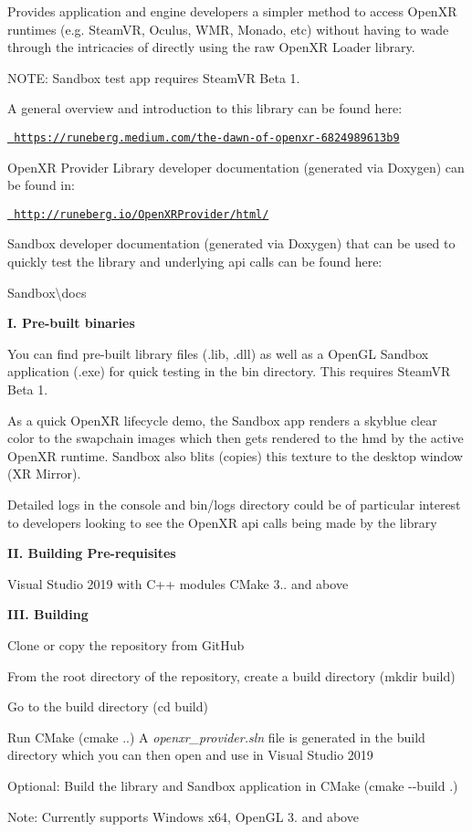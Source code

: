 Provides application and engine developers a simpler method to access Open\+XR runtimes (e.\+g. Steam\+VR, Oculus, W\+MR, Monado, etc) without having to wade through the intricacies of directly using the raw Open\+XR Loader library.

N\+O\+TE\+: Sandbox test app requires Steam\+VR Beta 1.

A general overview and introduction to this library can be found here\+:

\href{https://runeberg.medium.com/the-dawn-of-openxr-6824989613b9}{\texttt{ https\+://runeberg.\+medium.\+com/the-\/dawn-\/of-\/openxr-\/6824989613b9}}

Open\+XR Provider Library developer documentation (generated via Doxygen) can be found in\+:

\href{http://runeberg.io/OpenXRProvider/html/}{\texttt{ http\+://runeberg.\+io/\+Open\+X\+R\+Provider/html/}}

Sandbox developer documentation (generated via Doxygen) that can be used to quickly test the library and underlying api calls can be found here\+:

{\ttfamily Sandbox\textbackslash{}docs}

{\bfseries{I. Pre-\/built binaries}}

You can find pre-\/built library files (.lib, .dll) as well as a Open\+GL Sandbox application (.exe) for quick testing in the {\ttfamily bin} directory. This requires Steam\+VR Beta 1.

As a quick Open\+XR lifecycle demo, the Sandbox app renders a skyblue clear color to the swapchain images which then gets rendered to the hmd by the active Open\+XR runtime. Sandbox also blits (copies) this texture to the desktop window (XR Mirror).

Detailed logs in the console and {\ttfamily bin/logs} directory could be of particular interest to developers looking to see the Open\+XR api calls being made by the library

{\bfseries{II. Building Pre-\/requisites}}

Visual Studio 2019 with C++ modules C\+Make 3.. and above

{\bfseries{I\+II. Building}}


\begin{DoxyEnumerate}
\item Clone or copy the repository from Git\+Hub
\item From the root directory of the repository, create a build directory ({\ttfamily mkdir build})
\item Go to the build directory ({\ttfamily cd build})
\item Run C\+Make ({\ttfamily cmake ..}) A {\itshape openxr\+\_\+provider.\+sln} file is generated in the build directory which you can then open and use in Visual Studio 2019
\item Optional\+: Build the library and Sandbox application in C\+Make ({\ttfamily cmake -\/-\/build .})
\end{DoxyEnumerate}

Note\+: Currently supports Windows x64, Open\+GL 3. and above 